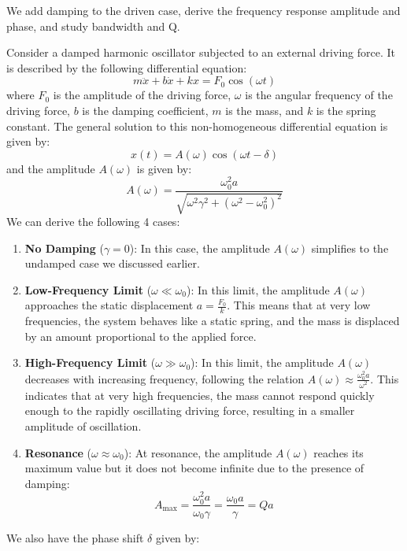 \documentclass[11pt]{report}
\begin{document}
We add damping to the driven case, derive the frequency response amplitude and phase, and study bandwidth and Q.
\begin{definition}
    Consider a damped harmonic oscillator subjected to an external driving force. It is described by the following differential equation:
    $$
        m\ddot{x} + b\dot{x} + kx = F_0 \cos(\omega t)
    $$
    where \( F_0 \) is the amplitude of the driving force, \( \omega \) is the angular frequency of the driving force, \( b \) is the damping coefficient, \( m \) is the mass, and \( k \) is the spring constant. The general solution to this non-homogeneous differential equation is given by:
    $$
        x(t) = A(\omega)\cos(\omega t - \delta)
    $$
    and the amplitude \( A(\omega) \) is given by:
    \begin{equation}\label{eq:damped_amplitude}
        A(\omega) = \frac{\omega_0^2 a}{\sqrt{\omega^2 \gamma^2 + (\omega^2 - \omega_0^2)^2}}
    \end{equation}
    We can derive the following 4 cases:
    \begin{enumerate}
        \item \textbf{No Damping} (\( \gamma = 0 \)): In this case, the amplitude \( A(\omega) \) simplifies to the undamped case we discussed earlier.
        \item \textbf{Low-Frequency Limit} (\( \omega \ll \omega_0 \)): In this limit, the amplitude \( A(\omega) \) approaches the static displacement \( a = \frac{F_0}{k} \). This means that at very low frequencies, the system behaves like a static spring, and the mass is displaced by an amount proportional to the applied force.
        \item \textbf{High-Frequency Limit} (\( \omega \gg \omega_0 \)): In this limit, the amplitude \( A(\omega) \) decreases with increasing frequency, following the relation \( A(\omega) \approx \frac{\omega_0^2 a}{\omega^2} \). This indicates that at very high frequencies, the mass cannot respond quickly enough to the rapidly oscillating driving force, resulting in a smaller amplitude of oscillation.
        \item \textbf{Resonance} (\( \omega \approx \omega_0 \)): At resonance, the amplitude \( A(\omega) \) reaches its maximum value but it does not become infinite due to the presence of damping: 
        $$
            A_{\text{max}} = \frac{\omega_0^2 a}{\omega_0 \gamma} = \frac{\omega_0 a}{\gamma} = Q a
        $$
    \end{enumerate}
    We also have the phase shift \( \delta \) given by:

\end{definition}
\end{document}
